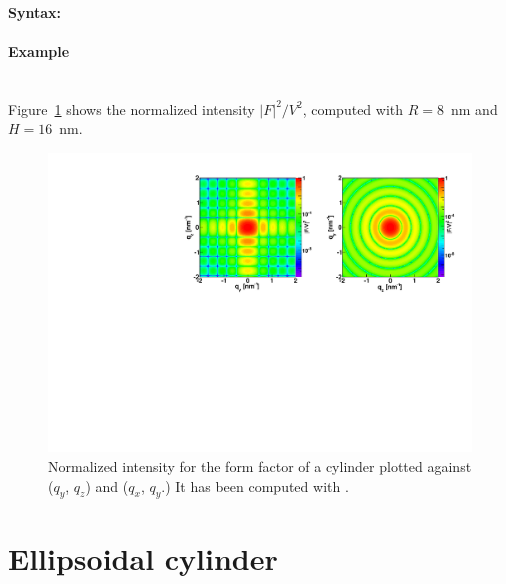 \paragraph{Syntax:} 

\newpage

\paragraph{Example}\mbox{}\\
Figure~\ref{fig:FFcylinderEx} shows the normalized intensity
$|F|^2/V^2$, computed with $R=8$~nm and \mbox{$H=16$~nm.}
\begin{figure}[ht]
\begin{center}
\includegraphics[angle=-90,width=\textwidth]{Figures/ff/figffcylinder.pdf}
\end{center}
\caption{Normalized intensity for the form factor of a cylinder plotted against ($q_y$, $q_z$) and  ($q_x$, $q_y$.) It
has been  computed with .}
\label{fig:FFcylinderEx}
\end{figure}

\newpage
\section{Ellipsoidal cylinder}  

